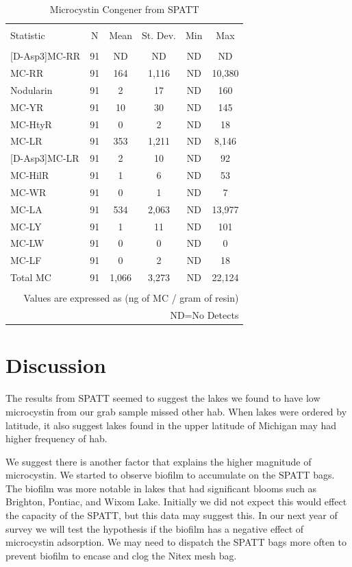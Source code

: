 \begin{table}[!ht]
\centering
  \caption{Microcystin Congener from SPATT}
  \label{tab:spattcongener}
\begin{tabular}{@{\extracolsep{5pt}}lccccc}
\\[-1.8ex]\hline
\hline \\[-1.8ex]
Statistic & \multicolumn{1}{c}{N} & \multicolumn{1}{c}{Mean} & \multicolumn{1}{c}{St. Dev.} & \multicolumn{1}{c}{Min} & \multicolumn{1}{c}{Max} \\
\hline \\[-1.8ex]
{[D-Asp3]}MC-RR & 91 & ND & ND & ND & ND \\
MC-RR & 91 & 164 & 1,116 & ND & 10,380 \\
Nodularin & 91 & 2 & 17 & ND & 160 \\
MC-YR & 91 & 10 & 30 & ND & 145 \\
MC-HtyR & 91 & 0 & 2 & ND & 18 \\
MC-LR & 91 & 353 & 1,211 & ND & 8,146 \\
{[D-Asp3]}MC-LR & 91 & 2 & 10 & ND & 92 \\
MC-HilR & 91 & 1 & 6 & ND & 53 \\
MC-WR & 91 & 0 & 1 & ND & 7 \\
MC-LA & 91 & 534 & 2,063 & ND & 13,977 \\
MC-LY & 91 & 1 & 11 & ND & 101 \\
MC-LW & 91 & 0 & 0 & ND & 0 \\
MC-LF & 91 & 0 & 2 & ND & 18 \\
Total MC & 91 & 1,066 & 3,273 & ND & 22,124 \\
\hline \\[-1.8ex]
\multicolumn{6}{r}{Values are expressed as (ng of MC / gram of resin)} \\
\multicolumn{6}{r}{ND=No Detects} \\
\end{tabular}
\end{table}


\clearpage
\newpage

\section{Discussion}

The results from SPATT seemed to suggest the lakes we found to have low microcystin from our grab sample missed other \gls{hab}. When lakes were ordered by latitude, it also suggest lakes found in the upper latitude of Michigan may had higher frequency of \gls{hab}.

We suggest there is another factor that explains the higher magnitude of microcystin. We started to observe biofilm to accumulate on the SPATT bags. The biofilm was more notable in lakes that had significant blooms such as Brighton, Pontiac, and Wixom Lake. Initially we did not expect this would effect the capacity of the SPATT, but this data may suggest this. In our next year of survey we will test the hypothesis if the biofilm has a negative effect of microcystin adsorption. We may need to dispatch the SPATT bags more often to prevent biofilm to encase and clog the Nitex mesh bag.



